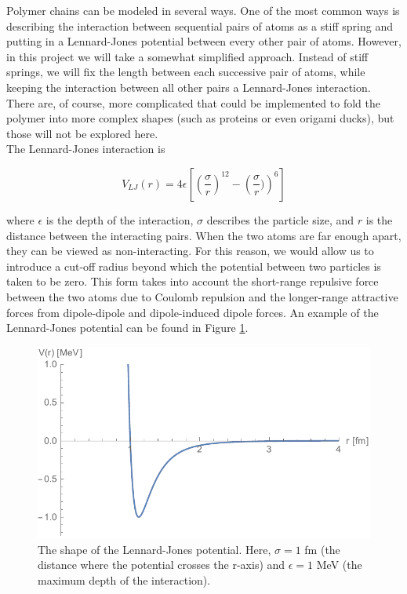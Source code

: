 \documentclass{article}
\begin{document}
\begin{multicols}{2}
Polymer chains can be modeled in several ways.  One of the most common ways is describing the interaction between sequential pairs of atoms as a stiff spring and putting in a Lennard-Jones potential between every other pair of atoms.  \cite{PhilNotes}  However, in this project we will take a somewhat simplified approach.  Instead of stiff springs, we will fix the length between each successive pair of atoms, while keeping the interaction between all other pairs a Lennard-Jones interaction.  There are, of course, more complicated that could be implemented to fold the polymer into more complex shapes (such as proteins or even origami ducks), but those will not be explored here.\\

The Lennard-Jones interaction is 

\begin{equation}
\label{VLJ}
V_{LJ}(r) = 4\epsilon \left [ \left ( \frac{\sigma}{r} \right ) ^{12} - \left ( \frac{\sigma}{r}) \right ) ^6 \right ]
\end{equation}

\noindent where $\epsilon$ is the depth of the interaction, $\sigma$ describes the particle size, and $r$ is the distance between the interacting pairs.  When the two atoms are far enough apart, they can be viewed as non-interacting.  For this reason, we would allow us to introduce a cut-off radius beyond which the potential between two particles is taken to be zero.  This form takes into account the short-range repulsive force between the two atoms due to Coulomb repulsion and the longer-range attractive forces from dipole-dipole and dipole-induced dipole forces.  An example of the Lennard-Jones potential can be found in Figure \ref{VLJfig}.

\begin{figure}[H]
\begin{center}
\includegraphics[width=\linewidth]{Figures/VLJ.pdf}
\caption{The shape of the Lennard-Jones potential.  Here, $\sigma=1$ fm (the distance where the potential crosses the r-axis) and $\epsilon =1$ MeV (the maximum depth of the interaction).}
\label{VLJfig}
\end{center}
\end{figure}


\end{multicols}
\end{document}
